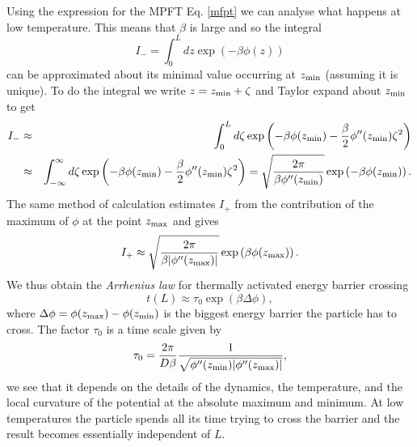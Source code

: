 \documentclass[11pt]{report}
\begin{document}
Using the expression for the MPFT Eq. \eqref{mfpt} we can analyse what happens at low temperature. This means that $\beta$ is large and so the integral
\begin{equation}
I_- = \int_0^L  dz \exp\left(-\beta \phi(z)\right)
\end{equation}
can be approximated about its minimal value occurring at $z_{\rm min}$ (assuming it is unique). To do the integral we write $z = z_{\rm min} + \zeta$ and Taylor expand about $z_{\rm min}$ to get
\begin{eqnarray}
I_- &\approx& \int_0^L  d\zeta \exp\left(-\beta \phi(z_{\rm min}) -\frac{\beta}{2} \phi''(z_{\rm min})\zeta^2\right) \nonumber \\
&\approx& \int_{-\infty}^{\infty}  d\zeta \exp\left(-\beta \phi(z_{\rm min}) -\frac{\beta}{2} \phi''(z_{\rm min})\zeta^2\right) =\sqrt{\frac{2\pi}{\beta \phi''(z_{\rm min})} }\exp\left(-\beta \phi(z_{\rm min})\right).\nonumber \\
\end{eqnarray}
The same method of calculation estimates $I_+$ from the contribution of the maximum of
$\phi$ at the point $z_{\rm max}$ and gives
\begin{equation}
I_+ \approx \sqrt{\frac{2\pi}{\beta |\phi''(z_{\rm max})|} }\exp\left(\beta \phi(z_{\rm max})\right).
\end{equation}
We thus obtain the {\em Arrhenius law} for thermally activated energy barrier crossing
\begin{equation}
\boxed{
t(L) \approx \tau_0 \exp(\beta \Delta \phi),}
\end{equation} 
where $\Delta \phi = \phi(z_{\rm max}) - \phi(z_{\rm min})$ is the biggest energy barrier the 
particle has to cross. The factor $\tau_0$ is a time scale given by
\begin{equation}
\tau_0 =\frac{2\pi}{D\beta}\frac{1}{\sqrt{ \phi''(z_{\rm min})|\phi''(z_{\rm max})|}} ,
\end{equation}
we see that it  depends on the details of the dynamics, the temperature, and the local curvature of the potential at the absolute maximum and minimum. At low temperatures the particle spends all its time trying to cross the barrier and the result becomes essentially independent of $L$.
\end{document}

